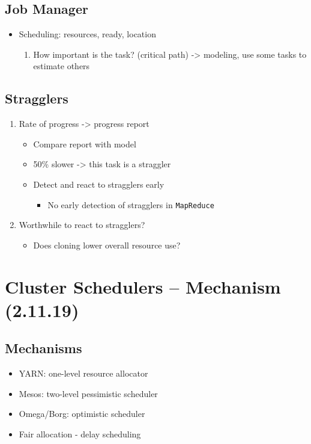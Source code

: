 \documentclass[11pt]{article}
\begin{document}
\subsection{Job Manager}
\label{sec:orgheadline9}
\begin{itemize}
\item Scheduling: resources, ready, location
\begin{enumerate}
\item How important is the task? (critical path) -> modeling, use some tasks to estimate others
\end{enumerate}
\end{itemize}

\subsection{Stragglers}
\label{sec:orgheadline10}
\begin{enumerate}
\item Rate of progress -> progress report
\begin{itemize}
\item Compare report with model
\item 50\% slower -> this task is a straggler
\item Detect and react to stragglers early
\begin{itemize}
\item No early detection of stragglers in \texttt{MapReduce}
\end{itemize}
\end{itemize}
\item Worthwhile to react to stragglers?
\begin{itemize}
\item Does cloning lower overall resource use?
\end{itemize}
\end{enumerate}

\section{Cluster Schedulers -- Mechanism (2.11.19)}
\label{sec:orgheadline16}

\subsection{Mechanisms}
\label{sec:orgheadline12}
\begin{itemize}
\item YARN: one-level resource allocator
\item Mesos: two-level pessimistic scheduler
\item Omega/Borg: optimistic scheduler

\item Fair allocation - delay scheduling
\end{itemize}
\end{document}
